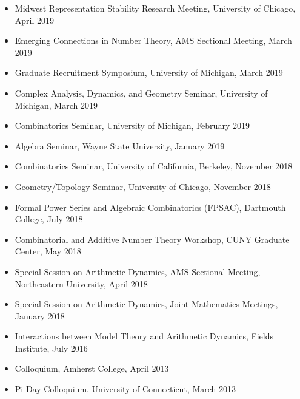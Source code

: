 \documentclass[11pt,letterpaper]{article}
\begin{document}
\begin{itemize}
    \item Midwest Representation Stability Research Meeting, University of Chicago, April 2019
    \item Emerging Connections in Number Theory, AMS Sectional Meeting, March 2019
    \item Graduate Recruitment Symposium, University of Michigan, March 2019
    \item Complex Analysis, Dynamics, and Geometry Seminar, University of Michigan, March 2019
    \item Combinatorics Seminar, University of Michigan, February 2019
    \item Algebra Seminar, Wayne State University, January 2019
    \item Combinatorics Seminar, University of California, Berkeley, November 2018
    \item Geometry/Topology Seminar, University of Chicago, November 2018
    \item Formal Power Series and Algebraic Combinatorics (FPSAC), Dartmouth College, July 2018
    \item Combinatorial and Additive Number Theory Workshop, CUNY Graduate Center, May 2018
    \item Special Session on Arithmetic Dynamics, AMS Sectional Meeting, Northeastern University, April 2018
    \item Special Session on Arithmetic Dynamics, Joint Mathematics Meetings, January 2018
    \item Interactions between Model Theory and Arithmetic Dynamics, Fields Institute, July 2016
    \item Colloquium, Amherst College, April 2013
    \item Pi Day Colloquium, University of Connecticut, March 2013
\end{itemize}
\end{document}
